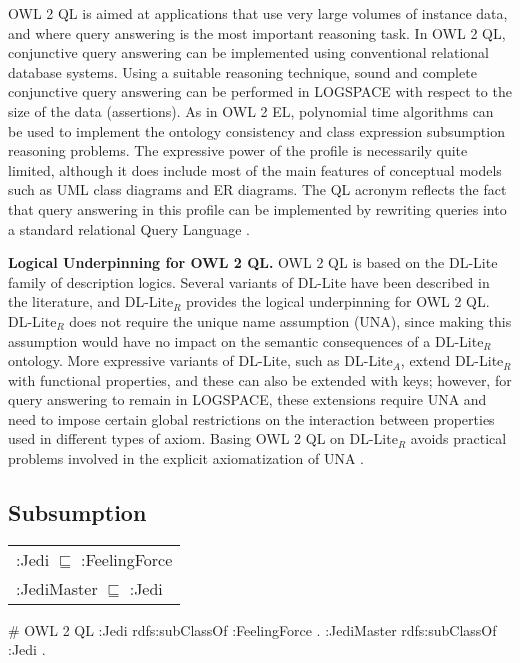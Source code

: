 \documentclass{llncs}
\newenvironment{DL}{
  \scriptsize
  \sffamily
  \vspace{0.3cm}
  \begin{tabular}{l}

}{
  \end{tabular}
  \linebreak
}
\begin{document}
OWL 2 QL is aimed at applications that use very large volumes of instance data, and where query answering is the most important reasoning task. In OWL 2 QL, conjunctive query answering can be implemented using conventional relational database systems. Using a suitable reasoning technique, sound and complete conjunctive query answering can be performed in LOGSPACE with respect to the size of the data (assertions). As in OWL 2 EL, polynomial time algorithms can be used to implement the ontology consistency and class expression subsumption reasoning problems. The expressive power of the profile is necessarily quite limited, although it does include most of the main features of conceptual models such as UML class diagrams and ER diagrams. The QL acronym reflects the fact that query answering in this profile can be implemented by rewriting queries into a standard relational Query Language \cite{owl2profiles2008}. 

\textbf{Logical Underpinning for OWL 2 QL.}
OWL 2 QL is based on the DL-Lite family of description logics. Several variants of DL-Lite have been described in the literature, and DL-Lite$_R$ provides the logical underpinning for OWL 2 QL. DL-Lite$_R$ does not require the unique name assumption (UNA), since making this assumption would have no impact on the semantic consequences of a DL-Lite$_R$ ontology. More expressive variants of DL-Lite, such as DL-Lite$_A$, extend DL-Lite$_R$ with functional properties, and these can also be extended with keys; however, for query answering to remain in LOGSPACE, these extensions require UNA and need to impose certain global restrictions on the interaction between properties used in different types of axiom. Basing OWL 2 QL on DL-Lite$_R$ avoids practical problems involved in the explicit axiomatization of UNA \cite{owl2profiles2008}. 

\subsection{Subsumption}

\begin{DL}
:Jedi $\sqsubseteq$ :FeelingForce \\
:JediMaster $\sqsubseteq$ :Jedi \\
\end{DL}

\begin{ex}
# OWL 2 QL
:Jedi rdfs:subClassOf :FeelingForce . 
:JediMaster rdfs:subClassOf :Jedi . 
\end{ex}
\end{document}
